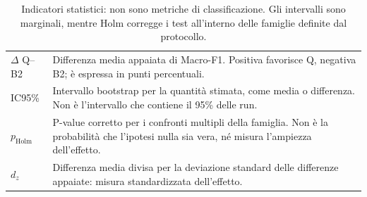 \begin{table}[tbp]
\centering
\small
\renewcommand{\arraystretch}{1.2}
\caption{Indicatori statistici: non sono metriche di classificazione.
Gli intervalli sono marginali, mentre Holm corregge i test all'interno
delle famiglie definite dal protocollo.}
\label{tab:guida-indicatori}
\begin{tabularx}{\textwidth}{@{}p{2.5cm}Y@{}}
\toprule
{}
 &  \\
\midrule
\(\Delta\) Q--B2 & Differenza media appaiata di Macro-F1. Positiva favorisce Q,
negativa B2; è espressa in punti percentuali. \\
IC95\% & Intervallo bootstrap per la quantità stimata, come media o differenza.
Non è l'intervallo che contiene il 95\% delle run. \\
\(p_{\mathrm{Holm}}\) & P-value corretto per i confronti multipli della famiglia.
Non è la probabilità che l'ipotesi nulla sia vera, né misura l'ampiezza dell'effetto. \\
\(d_z\) & Differenza media divisa per la deviazione standard delle differenze
appaiate: misura standardizzata dell'effetto. \\
\bottomrule
\end{tabularx}
\end{table}
